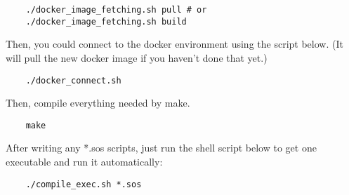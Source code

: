 \documentclass[main.tex]{subfiles}
\begin{document}
	\begin{lstlisting}
    ./docker_image_fetching.sh pull # or
    ./docker_image_fetching.sh build
	\end{lstlisting}

	Then, you could connect to the docker environment using the script below. (It will pull the new docker image if you haven't done that yet.)

	\begin{lstlisting}
    ./docker_connect.sh
	\end{lstlisting}

	Then, compile everything needed by make.

	\begin{lstlisting}
    make
	\end{lstlisting}

	After writing any *.sos scripts, just run the shell script below to get one executable and run it automatically:

	\begin{lstlisting}
    ./compile_exec.sh *.sos
	\end{lstlisting}
\end{document}
